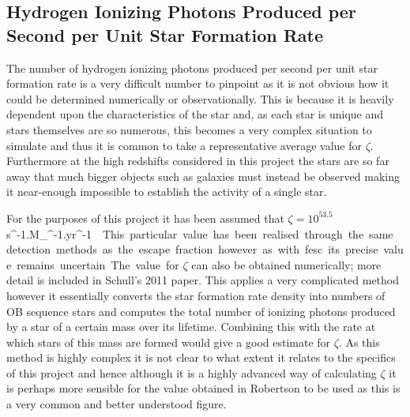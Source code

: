 	\subsection{Hydrogen Ionizing Photons Produced per Second per Unit Star Formation Rate} %
	\label{sub:hydrogen_ionizing_photons_produced_per_second_per_unit_star_formation_rate}
		The number of hydrogen ionizing photons produced per second per unit star formation rate is a very difficult number to pinpoint as it is not obvious how it could be determined numerically or observationally. This is because it is heavily dependent upon the characteristics of the star and, as each star is unique and stars themselves are so numerous, this becomes a very complex situation to simulate and thus it is common to take a representative average value for $\zeta$. Furthermore at the high redshifts considered in this project the stars are so far away that much bigger objects such as galaxies must instead be observed making it near-enough impossible to establish the activity of a single star.

		For the purposes of this project it has been assumed that $\zeta=10^{53.5}$\si{s^{-1}.M_{\odot}^{-1}.yr^{-1}}\cite{robertson2010early}. This particular value has been realised through the same detection methods as the escape fraction however as with fesc its precise value remains uncertain.

		The value for $\zeta$ can also be obtained numerically; more detail is included in Schull’s 2011 paper\cite{shull2012critical}. This applies a very complicated method however it essentially converts the star formation rate density into numbers of OB sequence stars and computes the total number of ionizing photons produced by a star of a certain mass over its lifetime. Combining this with the rate at which stars of this mass are formed would give a good estimate for $\zeta$. As this method is highly complex it is not clear to what extent it relates to the specifics of this project and hence although it is a highly advanced way of calculating $\zeta$ it is perhaps more sensible for the value obtained in Robertson to be used as this is a very common and better understood figure.
